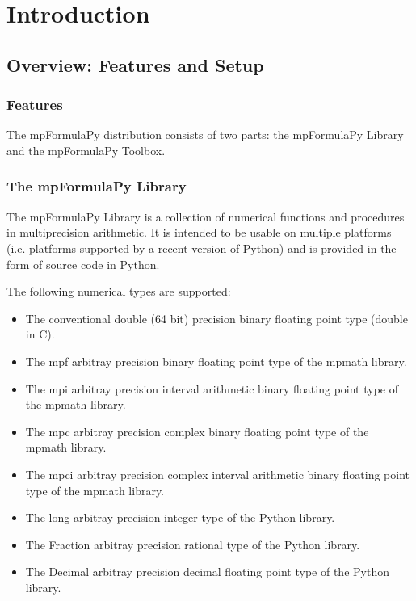 \chapter{Introduction}
\label{Introduction1} 


\section{Overview: Features and Setup}

\subsection{Features}
The mpFormulaPy distribution consists of two parts: the mpFormulaPy Library and the mpFormulaPy Toolbox.

\subsection{The mpFormulaPy Library}
The mpFormulaPy Library is a collection of numerical functions and procedures in multiprecision arithmetic. It is intended to be usable on multiple platforms (i.e. platforms supported by a recent version of Python) and is provided in the form of source code in Python. 

The following numerical types are supported:

\begin{itemize}		
  \item The conventional double (64 bit) precision binary floating point type (double in C).
  \item The mpf arbitray precision binary floating point type of the mpmath library.
  \item The mpi arbitray precision interval arithmetic binary floating point type of the mpmath library.
  \item The mpc arbitray precision complex binary floating point type of the mpmath library. 
  \item The mpci arbitray precision complex interval arithmetic binary floating point type of the mpmath library.
  \item The long arbitray precision integer type of the Python library. 
  \item The Fraction arbitray precision rational type of the Python library. 
  \item The Decimal arbitray precision decimal floating point type of the Python library. 
\end{itemize}

